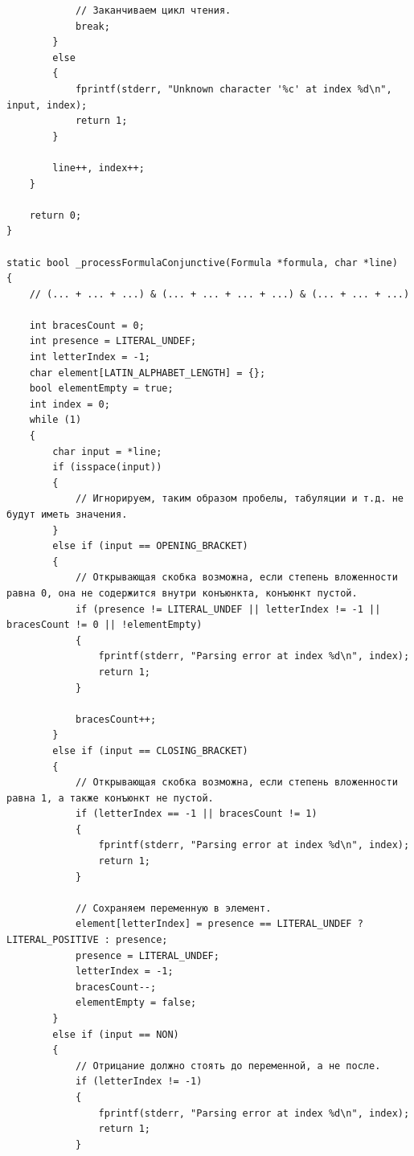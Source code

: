 \documentclass[a4paper,14pt]{extarticle}
\begin{document}
\begin{verbatim}
            // Заканчиваем цикл чтения.
            break;
        }
        else
        {
            fprintf(stderr, "Unknown character '%c' at index %d\n", input, index);
            return 1;
        }

        line++, index++;
    }

    return 0;
}

static bool _processFormulaConjunctive(Formula *formula, char *line)
{
    // (... + ... + ...) & (... + ... + ... + ...) & (... + ... + ...)

    int bracesCount = 0;
    int presence = LITERAL_UNDEF;
    int letterIndex = -1;
    char element[LATIN_ALPHABET_LENGTH] = {};
    bool elementEmpty = true;
    int index = 0;
    while (1)
    {
        char input = *line;
        if (isspace(input))
        {
            // Игнорируем, таким образом пробелы, табуляции и т.д. не будут иметь значения.
        }
        else if (input == OPENING_BRACKET)
        {
            // Открывающая скобка возможна, если степень вложенности равна 0, она не содержится внутри конъюнкта, конъюнкт пустой. 
            if (presence != LITERAL_UNDEF || letterIndex != -1 || bracesCount != 0 || !elementEmpty)
            {
                fprintf(stderr, "Parsing error at index %d\n", index);
                return 1;
            }

            bracesCount++;
        }
        else if (input == CLOSING_BRACKET)
        {
            // Открывающая скобка возможна, если степень вложенности равна 1, а также конъюнкт не пустой.
            if (letterIndex == -1 || bracesCount != 1)
            {
                fprintf(stderr, "Parsing error at index %d\n", index);
                return 1;
            }

            // Сохраняем переменную в элемент.
            element[letterIndex] = presence == LITERAL_UNDEF ? LITERAL_POSITIVE : presence;
            presence = LITERAL_UNDEF;
            letterIndex = -1;
            bracesCount--;
            elementEmpty = false;
        }
        else if (input == NON)
        {
            // Отрицание должно стоять до переменной, а не после.
            if (letterIndex != -1)
            {
                fprintf(stderr, "Parsing error at index %d\n", index);
                return 1;
            }


\end{verbatim}
\end{document}
